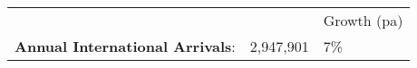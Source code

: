 \begin{tabular}[t]{p{4.8cm}>{\hfill}p{1.3cm}>{\hfill}p{1.4cm}}
   &   & Growth (pa) \\ 
 \textbf{Annual International Arrivals}: & 2,947,901 & 7\% \\ 
  \end{tabular}
